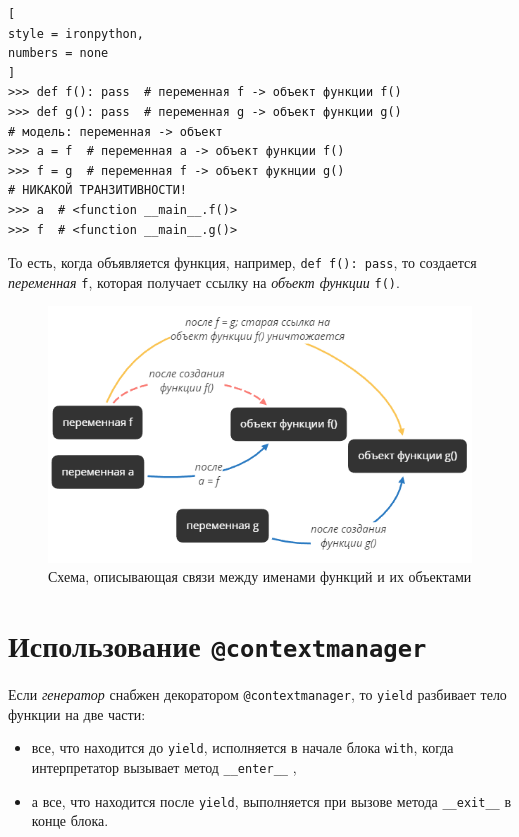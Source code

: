 \documentclass[%
	11pt,
	a4paper,
	utf8,
		]{article}
\begin{document}
\begin{lstlisting}[
style = ironpython,
numbers = none
]
>>> def f(): pass  # переменная f -> объект функции f()
>>> def g(): pass  # переменная g -> объект функции g()
# модель: переменная -> объект
>>> a = f  # переменная a -> объект функции f()
>>> f = g  # переменная f -> объект фукнции g()
# НИКАКОЙ ТРАНЗИТИВНОСТИ!
>>> a  # <function __main__.f()>
>>> f  # <function __main__.g()>
\end{lstlisting}

То есть, когда объявляется функция, например, \texttt{def f(): pass}, то создается \emph{переменная} \texttt{f}, которая получает ссылку на \emph{объект функции} \texttt{f()}.


\begin{figure}[h]
	\centering
	\includegraphics[scale=0.85]{figures/variable_with_link_function.png}
	\caption{ Схема, описывающая связи между именами функций и их объектами }\label{fig:variable_with_link_function}
\end{figure}

\section{Использование \texttt{@contextmanager}}

Если \emph{генератор} снабжен декоратором \texttt{@contextmanager}, то \texttt{yield} разбивает тело функции на две части:

\begin{itemize}
	\item все, что находится до \texttt{yield}, исполняется в начале блока \texttt{with}, когда интерпретатор вызывает метод \texttt{\_\_enter\_\_} ,
	
	\item а все, что находится после \texttt{yield}, выполняется при вызове метода \texttt{\_\_exit\_\_} в конце блока.
\end{itemize}
\end{document}
